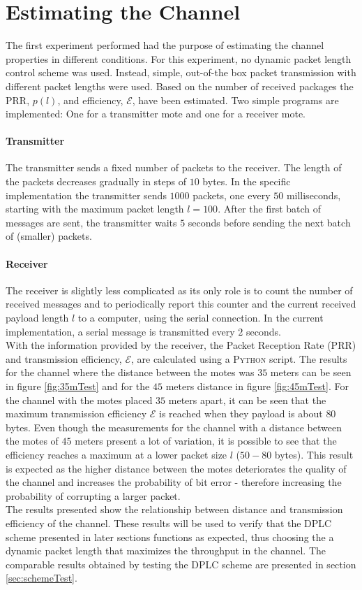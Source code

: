 \section{Estimating the Channel\label{sec:chanEst}}
The first experiment performed had the purpose of estimating the channel properties in different conditions. For this experiment, no dynamic packet length control scheme was used. Instead, simple, out-of-the box packet transmission  with different packet lengths were used. Based on the number of received packages the PRR, $p(l)$, and efficiency, $\mathcal{E}$, have been estimated. Two simple programs are implemented: One for a transmitter mote and one for a receiver mote.
\paragraph{Transmitter} The transmitter sends a fixed number of packets to the receiver. The length of the packets decreases gradually in steps of $10$ bytes. In the specific implementation the transmitter sends $1000$ packets, one every $50$ milliseconds, starting with the maximum packet length $l = 100$. After the first batch of messages are sent, the transmitter waits $5$ seconds before sending the next batch of (smaller) packets.
\paragraph{Receiver} The receiver is slightly less complicated as its only role is to count the number of received messages and to periodically report this counter and the current received payload length $l$ to a computer, using the serial connection. In the current implementation, a serial message is transmitted every $2$ seconds.
\\[8pt]
With the information provided by the receiver, the Packet Reception Rate (PRR) and transmission efficiency, $\mathcal{E}$, are calculated using a \textsc{Python} script. The results for the channel where the distance between the motes was $35$ meters can be seen in figure \ref{fig:35mTest} and for the $45$ meters distance in figure \ref{fig:45mTest}. For the channel with the motes placed $35$ meters apart, it can be seen that the maximum transmission efficiency $\mathcal{E}$ is reached when they payload is about $80$ bytes. Even though the measurements for the channel with a distance between the motes of $45$ meters present a lot of variation, it is possible to see that the efficiency reaches a maximum at a lower packet size $l$ ($50-80$ bytes). This result is expected as the higher distance between the motes deteriorates the quality of the channel and increases the probability of bit error - therefore increasing the probability of corrupting a larger packet.
\\[8pt]
The results presented show the relationship between distance and transmission efficiency of the channel. These results will be used to verify that the DPLC scheme presented in later sections functions as expected, thus choosing the a dynamic packet length that maximizes the throughput in the channel. The comparable results obtained by testing the DPLC scheme are presented in section \ref{sec:schemeTest}.

